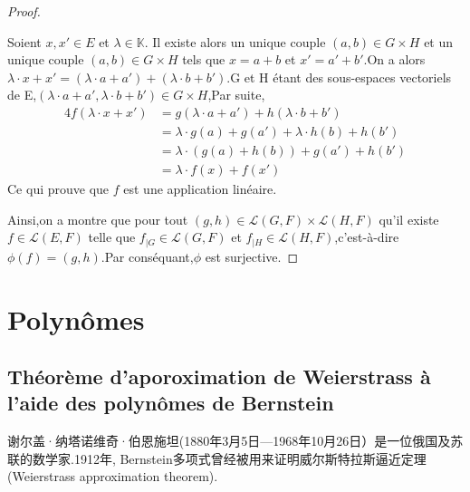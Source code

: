 \documentclass[12pt]{book}
\theoremstyle{definition}\newtheorem{dfn}{Définition}[chapter]
\theoremstyle{plain}\newtheorem{thm}{Théorème}[chapter]
\theoremstyle{plain}\newtheorem{prp}{Proposition}[chapter]
\theoremstyle{plain}\newtheorem{lem}{\bf Lemme}[chapter]
\theoremstyle{plain}\newtheorem{axm}{\bf Axiome}[chapter]
\theoremstyle{plain}\newtheorem{lmm}{\bf Lemme}[chapter]
\theoremstyle{plain}\newtheorem{cor}{\bf Corollaire}[chapter]
\theoremstyle{remark}\newtheorem{rem}{Remarque}[chapter]
\begin{document}
\begin{proof}
\begin{itemize}
\begin{itemize}
 Soient $x,x'\in E$ et $\lambda \in \mathbb{K}$.
 Il existe alors un unique couple $(a,b)\in G\times H$ et un unique couple $(a,b)\in G\times H$ tels que $x=a+b$ et $x'=a'+b'$.On a alors $\lambda \cdot x+x'=(\lambda\cdot a+a')+(\lambda\cdot b+b')$.G et H étant des sous-espaces vectoriels de E,$ (\lambda\cdot a+a',\lambda\cdot b+b')\in G\times H$,Par suite,
 \begin{alignat*}{4}
 f(\lambda\cdot x+x')&=g(\lambda\cdot a+a')+h(\lambda\cdot b+b')\\
 &=\lambda \cdot g(a)+g(a')+\lambda\cdot h(b)+h(b')\\
 &=\lambda\cdot(g(a)+h(b))+g(a')+h(b')\\
 &=\lambda\cdot f(x)+f(x')
 \end{alignat*}
 Ce qui prouve que $f$ est une application linéaire.
\end{itemize}
\end{itemize}
Ainsi,on a montre que pour tout $(g,h)\in \mathcal{L}(G,F)\times \mathcal{L}(H,F)$ qu'il existe $f\in \mathcal{L}(E,F)$ telle que
$f_{|G}\in\mathcal{L}(G,F)$
et $f_{|H}\in\mathcal{L}(H,F)$,c'est-à-dire $\phi(f)=(g,h)$.Par conséquant,$\phi$ est surjective.

\end{proof}
\chapter{Polynômes}
\section{Théorème d'aporoximation de Weierstrass à l'aide des polynômes de Bernstein}
谢尔盖·纳塔诺维奇·伯恩施坦(1880年3月5日—1968年10月26日）是一位俄国及苏联的数学家.1912年, Bernstein多项式曾经被用来证明威尔斯特拉斯逼近定理 (Weierstrass approximation theorem).
\end{document}
